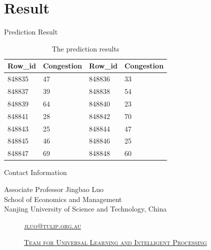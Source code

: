 \documentclass[
 size=14pt,
 paper=smartboard,  %
 mode=present, 		%
 display=slides, 	%
 style=tuliplab,  	%
 pauseslide,
 fleqn,leqno]{powerdot}
\begin{document}
\section{Result}

\begin{slide}[toc=,bm=]{Prediction Result}
	\begin{table}[tb]
		\setlength{\abovecaptionskip}{10pt}
		\setlength{\belowcaptionskip}{15pt}
		\centering
		\caption{The prediction results}
		
		\begin{tabular}{p{2.5cm}p{2.5cm}p{2.5cm}p{2.5cm}}
		\hline
		  Row_id & Congestion  &  Row_id & Congestion \\
		\hline
		848835 & 47 & 848836 & 33\\
		848837 & 39 & 848838 & 54\\
		848839 & 64 & 848840 & 23\\
		848841 & 28 & 848842 & 70\\
		848843 & 25 & 848844 & 47\\
		848845 & 46 & 848846 & 25\\
		848847 & 69 & 848848 & 60\\
		\hline
		\end{tabular}
		\end{table}
\end{slide}

\begin{wideslide}[toc=,bm=]{Contact Information}
\centering
{}
\twocolumn[
lcolwidth=0.35\linewidth,
rcolwidth=0.65\linewidth
]
{
}
{
Associate Professor Jingbao Luo\\
School of Economics and Management\\
Nanjing University of Science and Technology, China
\begin{description}
 \item[\textcolor{orange}{\faEnvelope}] \href{mailto:jluo@tulip.org.au}
 {\textsc{\footnotesize{jluo@tulip.org.au}}}

 \item[\textcolor{orange}{\faHome}] \href{http://www.tulip.org.au}
 {\textsc{\footnotesize{Team for Universal Learning and Intelligent Processing}}}
\end{description}
}
\end{wideslide}
\end{document}
